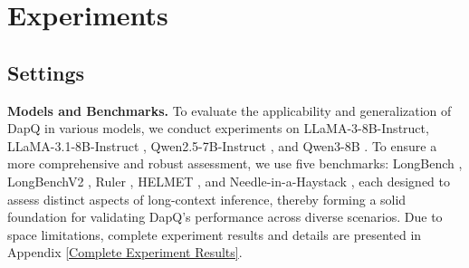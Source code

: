 \section{Experiments}





\subsection{Settings}
\textbf{Models and Benchmarks.}
To evaluate the applicability and generalization of DapQ in various models, we conduct experiments on LLaMA-3-8B-Instruct, LLaMA-3.1-8B-Instruct \citep{llama3}, Qwen2.5-7B-Instruct \citep{qwen2}, and Qwen3-8B \citep{qwen3}. To ensure a more comprehensive and robust assessment, we use five benchmarks: LongBench \citep{longbench}, LongBenchV2 \citep{longbenchv2}, Ruler \citep{ruler}, HELMET \citep{helmet}, and Needle-in-a-Haystack \citep{needle}, each designed to assess distinct aspects of long-context inference, thereby forming a solid foundation for validating DapQ's performance across diverse scenarios. Due to space limitations, complete experiment results and details are presented in Appendix \ref{Complete Experiment Results}.



